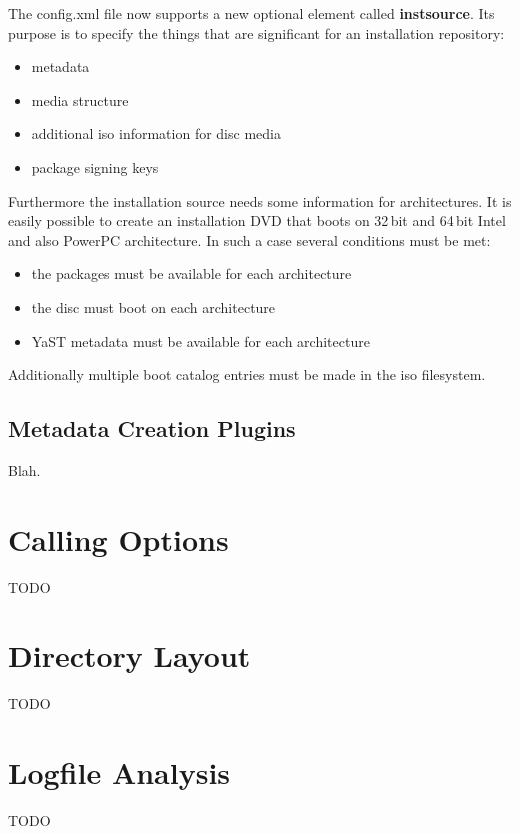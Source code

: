 The config.xml file now supports a new optional element called
\textbf{instsource}. Its purpose is to specify the things that are significant
for an installation repository:
\begin{itemize}
  \item{metadata}
  \item{media structure}
  \item{additional iso information for disc media}
  \item{package signing keys}
\end{itemize}

Furthermore the installation source needs some information for architectures. It
is easily possible to create an installation DVD that boots on 32\,bit and
64\,bit Intel and also PowerPC architecture. In such a case several conditions
must be met:
\begin{itemize}
  \item{the packages must be available for each architecture}
  \item{the disc must boot on each architecture}
  \item{YaST metadata must be available for each architecture}
\end{itemize}
Additionally multiple boot catalog entries must be made in the iso filesystem.


\subsection{Metadata Creation Plugins}
\label{subsec:plugins}

Blah.


\section{Calling Options}

TODO


\section{Directory Layout}

TODO


\section{Logfile Analysis}

TODO





